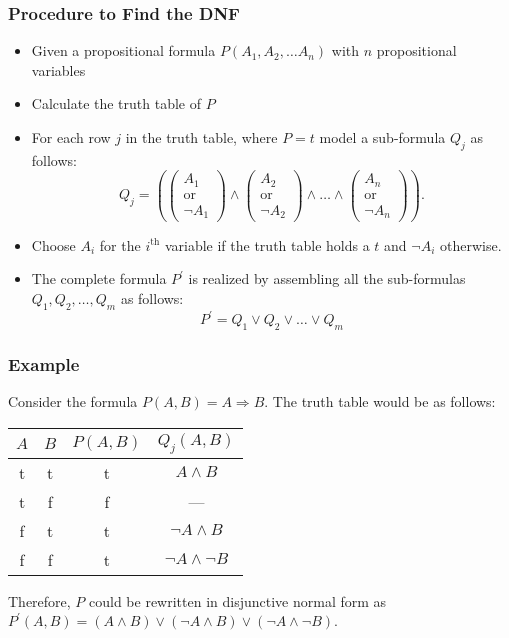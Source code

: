 \documentclass{beamer}
\theoremstyle{remark}
\begin{document}
\begin{frame}
\frametitle{Procedure to Find the DNF}
\begin{itemize}
	\item Given a propositional formula $P(A_1, A_2, \ldots A_n)$ with $n$ propositional variables
	\pause
	\item Calculate the truth table of $P$
	
	\item For each row $j$ in the truth table, where $P=t$ model a sub-formula $Q_j$ as follows:
	\pause
	\[Q_j = \left ( \left ( \begin{matrix}A_1 \\ \text{or} \\ \lnot A_1  \end{matrix} \right ) \land
		\left ( \begin{matrix}A_2 \\ \text{or} \\ \lnot A_2  \end{matrix} \right ) \land \ldots \land
		\left (\begin{matrix}A_n \\ \text{or} \\ \lnot A_n  \end{matrix}\right ) \right ). \]
	
	\item Choose $A_i$ for the $i^{\text{th}}$ variable if the truth table holds a $t$ and $\lnot A_i$ otherwise.
	\pause
	\item The complete formula $P^{\prime}$ is realized by assembling all the sub-formulas $Q_1, Q_2, \ldots, Q_m$ as follows:
		\[P^{\prime} = Q_1 \lor Q_2 \lor \ldots \lor Q_m\]
\end{itemize}
\end{frame}

\begin{frame}
\frametitle{Example}

\begin{example}
	Consider the formula $P(A, B) = A \Rightarrow B$. The truth table would be as follows:
	\begin{center}
	\begin{tabular}{c|c||c||c}
		$A$ & $B$ & $P(A, B)$ & $Q_j(A, B)$\\ \hline
		t & t & \pause  t & \pause $A \land B$\\ \hline
		t & f & \pause f &\pause --- \\ \hline
		f & t & \pause t & \pause $\lnot A \land B$ \\ \hline
		f & f & \pause t & \pause $\lnot A \land \lnot B$
	\end{tabular}
	\vspace{1.5em}
	
	Therefore, $P$ could be rewritten in disjunctive normal form as $P^{\prime}(A, B) = (A \land B) \lor (\lnot A \land B) \lor (\lnot A \land \lnot B)$.
	\end{center}
\end{example}
\end{frame}
\end{document}

